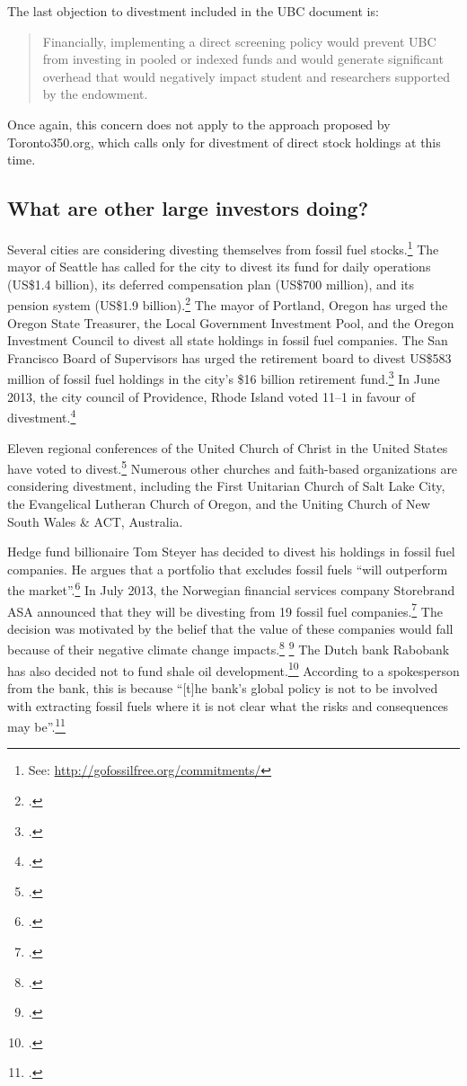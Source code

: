 \documentclass[10pt]{article}
\begin{document}
The last objection to divestment included in the UBC document is:
\begin{quote}
Financially, implementing a direct screening policy would prevent UBC from investing in pooled or indexed funds and would generate significant overhead that would negatively impact student and researchers supported by the endowment.
\end{quote}
Once again, this concern does not apply to the approach proposed by Toronto350.org, which calls only for divestment of direct stock holdings at this time.



	\subsection{What are other large investors doing?}
	\label{LargeInvestors}



Several cities are considering divesting themselves from fossil fuel stocks.\footnote{See: \url{http://gofossilfree.org/commitments/}}
The mayor of Seattle has called for the city to divest its fund for daily operations (US\$1.4 billion), its deferred compensation plan (US\$700 million), and its pension system (US\$1.9 billion).\footcite[][]{SeattleDivest}
The mayor of Portland, Oregon has urged the Oregon State Treasurer, the Local Government Investment Pool, and the Oregon Investment Council to divest all state holdings in fossil fuel companies.
The San Francisco Board of Supervisors has urged the retirement board to divest US\$583 million of fossil fuel holdings in the city's \$16 billion retirement fund.\footcite[][]{DivestProtect40to60}
In June 2013, the city council of Providence, Rhode Island voted 11--1 in favour of divestment.\footcite[][]{ProvidenceDivest}



Eleven regional conferences of the United Church of Christ in the United States have voted to divest.\footcite[][]{ChurchesFFDivestment}
Numerous other churches and faith-based organizations are considering divestment, including the First Unitarian Church of Salt Lake City, the Evangelical Lutheran Church of Oregon, and the Uniting Church of New South Wales \& ACT, Australia.



Hedge fund billionaire Tom Steyer has decided to divest his holdings in fossil fuel companies.
He argues that a portfolio that excludes fossil fuels ``will outperform the market''.\footcite[][]{SteyerMiddleburyLetter}
In July 2013, the Norwegian financial services company Storebrand ASA announced that they will be divesting from 19 fossil fuel companies.\footcite[][]{StorebrandPR}
The decision was motivated by the belief that the value of these companies would fall because of their negative climate change impacts.\footcite[][]{StorebrandNews} \footcite[See also: ][]{GristStorebrand}
The Dutch bank Rabobank has also decided not to fund shale oil development.\footcite[][]{RabobankRefuses}
According to a spokesperson from the bank, this is because ``[t]he bank's global policy is not to be involved with extracting fossil fuels where it is not clear what the risks and consequences may be''.\footcite[][]{RabobankNews}
\end{document}
